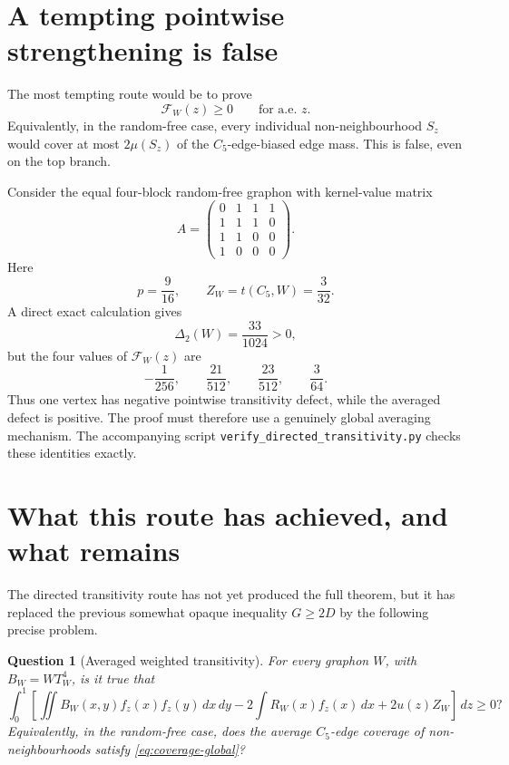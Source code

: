 \documentclass[11pt]{article}
\newtheorem{question}{Question}
\newcommand{\dd}{\,d}
\newcommand{\DeltaTwo}{\Delta_2}
\begin{document}
\section{A tempting pointwise strengthening is false}

The most tempting route would be to prove
\begin{equation}
\mathcal F_W(z)\ge0\qquad\text{for a.e. }z.
\tag{false-pointwise}
\end{equation}
Equivalently, in the random-free case, every individual non-neighbourhood
\(S_z\) would cover at most \(2\mu(S_z)\) of the \(C_5\)-edge-biased edge mass.
This is false, even on the top branch.

Consider the equal four-block random-free graphon with kernel-value matrix
\begin{equation}
A=
\begin{pmatrix}
0&1&1&1\\
1&1&1&0\\
1&1&0&0\\
1&0&0&0
\end{pmatrix}.
\end{equation}
Here
\[
p=\frac{9}{16},\qquad Z_W=t(C_5,W)=\frac{3}{32}.
\]
A direct exact calculation gives
\[
\DeltaTwo(W)=\frac{33}{1024}>0,
\]
but the four values of \(\mathcal F_W(z)\) are
\[
-\frac1{256},\qquad \frac{21}{512},\qquad \frac{23}{512},
\qquad \frac3{64}.
\]
Thus one vertex has negative pointwise transitivity defect, while the averaged
defect is positive.  The proof must therefore use a genuinely global averaging
mechanism.  The accompanying script \texttt{verify\_directed\_transitivity.py}
checks these identities exactly.

\section{What this route has achieved, and what remains}

The directed transitivity route has not yet produced the full theorem, but it
has replaced the previous somewhat opaque inequality \(G\ge2D\) by the following
precise problem.

\begin{question}[Averaged weighted transitivity]
For every graphon \(W\), with \(B_W=W T_W^4\), is it true that
\begin{equation}
\int_0^1
\left[
\iint B_W(x,y)f_z(x)f_z(y)\dd x\dd y
-2\int R_W(x)f_z(x)\dd x
+2u(z)Z_W
\right]
\dd z\ge0?
\end{equation}
Equivalently, in the random-free case, does the average \(C_5\)-edge coverage
of non-neighbourhoods satisfy \eqref{eq:coverage-global}?
\end{question}
\end{document}
